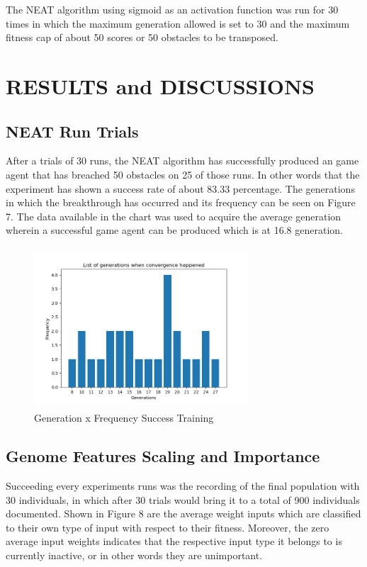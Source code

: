 \documentclass[journal]{IEEEtran}
\begin{document}
The NEAT algorithm using sigmoid as an activation function was run for 30 times in which the maximum generation allowed is set to 30 and the maximum fitness cap of about 50 scores or 50 obstacles to be transposed.

\section{RESULTS and DISCUSSIONS}

\subsection{NEAT Run Trials}
After a trials of 30 runs, the NEAT algorithm has successfully produced an game agent that has breached 50 obstacles on 25 of those runs. In other words that the experiment has shown a success rate of about 83.33 percentage. The generations in which the breakthrough has occurred and its frequency can be seen on Figure 7. The data available in the chart was used to acquire the average generation wherein a successful game agent can be produced which is at 16.8 generation.

\begin{figure}[htbp]
\begin{center}
\includegraphics[width=8cm, height=6cm]{genPlot.png}
\caption{Generation x Frequency Success Training}
\end{center}
\end{figure}

\subsection{Genome Features Scaling and Importance}
Succeeding every experiments runs was the recording of the final population with 30 individuals, in which after 30 trials would bring it to a total of 900 individuals documented. Shown in Figure 8 are the average weight inputs which are classified to their own type of input with respect to their fitness. Moreover, the zero average input weights indicates that the respective input type it belongs to is currently inactive, or in other words they are unimportant. 
\end{document}
